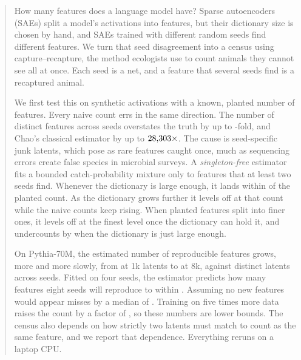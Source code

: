 \begin{abstract}
How many features does a language model have? Sparse autoencoders (SAEs) split a model's activations into features, but their dictionary size is chosen by hand, and SAEs trained with different random seeds find different features. We turn that seed disagreement into a census using capture--recapture, the method ecologists use to count animals they cannot see all at once. Each seed is a net, and a feature that several seeds find is a recaptured animal.

We first test this on synthetic activations with a known, planted number of features. Every naive count errs in the same direction. The number of distinct features across seeds overstates the truth by up to \UnionRatioMax-fold, and Chao's classical estimator by up to $\ChaoRatioMax$. The cause is seed-specific junk latents, which pose as rare features caught once, much as sequencing errors create false species in microbial surveys. A \emph{singleton-free} estimator fits a bounded catch-probability mixture only to features that at least two seeds find. Whenever the dictionary is large enough, it lands within \SfMaxErrComplete{} of the planted count. As the dictionary grows further it levels off at that count while the naive counts keep rising. When planted features split into finer ones, it levels off at the finest level once the dictionary can hold it, and undercounts by \HierSfErrFull{} when the dictionary is just large enough.

On Pythia-70M, the estimated number of reproducible features grows, more and more slowly, from \RealSfOne{} at 1k latents to \RealSfEight{} at 8k, against \RealUnionEight{} distinct latents across seeds. Fitted on four seeds, the estimator predicts how many features eight seeds will reproduce to within \HeldRealSfMax. Assuming no new features would appear misses by a median of \HeldRealNoGrowthMed. Training on five times more data raises the count by a factor of \RealLongRatio{}, so these numbers are lower bounds. The census also depends on how strictly two latents must match to count as the same feature, and we report that dependence. Everything reruns on a laptop CPU.
\end{abstract}
